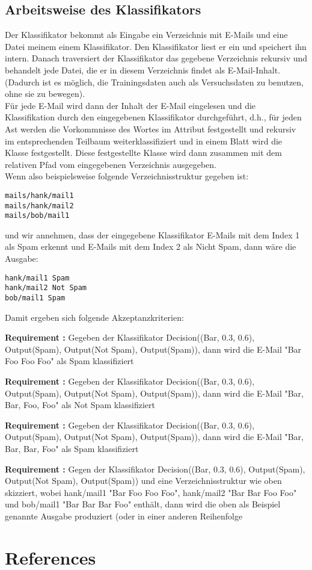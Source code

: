 \documentclass{article}
\newcounter{requirementscount}{}
\newcommand{\requirement}[1] {
        \addtocounter{requirementscount}{1}
        {\bf Requirement \therequirementscount:} #1\\
    }
\begin{document}
\subsection{Arbeitsweise des Klassifikators}
Der Klassifikator bekommt als Eingabe ein Verzeichnis mit E-Mails und eine
Datei meinem einem Klassifikator. Den Klassifikator liest er ein und
speichert ihn intern. Danach traversiert der Klassifikator das gegebene
Verzeichnis rekursiv und behandelt jede Datei, die er in diesem Verzeichnis
findet als E-Mail-Inhalt. (Dadurch ist es m\"oglich, die Trainingsdaten auch
als Versuchsdaten zu benutzen, ohne sie zu bewegen).\\
F\"ur jede E-Mail wird dann der Inhalt der E-Mail eingelesen und die
Klassifikation durch den eingegebenen Klassifikator durchgef\"uhrt, d.h., 
f\"ur jeden Ast werden die Vorkommnisse des Wortes im Attribut
festgestellt und rekursiv im entsprechenden Teilbaum weiterklassifiziert
und in einem Blatt wird die Klasse festgestellt. Diese festgestellte Klasse
wird dann zusammen mit dem relativen Pfad vom eingegebenen Verzeichnis
ausgegeben.\\
Wenn also beispielsweise folgende Verzeichnisstruktur gegeben ist:
\begin{verbatim}
mails/hank/mail1
mails/hank/mail2
mails/bob/mail1
\end{verbatim}
und wir annehmen, dass der eingegebene Klassifikator E-Mails mit dem Index
1 als Spam erkennt und E-Mails mit dem Index 2 als Nicht Spam, dann
w\"are die Ausgabe:
\begin{verbatim}
hank/mail1 Spam
hank/mail2 Not Spam
bob/mail1 Spam
\end{verbatim}
Damit ergeben sich folgende Akzeptanzkriterien:\\
\requirement{Gegeben der Klassifikator Decision((Bar, 0.3, 0.6), Output(Spam),
Output(Not Spam), Output(Spam)), dann wird die E-Mail "Bar Foo Foo Foo" als
Spam klassifiziert}
\requirement{Gegeben der Klassifikator Decision((Bar, 0.3, 0.6), Output(Spam),
Output(Not Spam), Output(Spam)), dann wird die E-Mail "Bar, Bar, Foo, Foo" als
Not Spam klassifiziert}
\requirement{Gegeben der Klassifikator Decision((Bar, 0.3, 0.6), Output(Spam),
Output(Not Spam), Output(Spam)), dann wird die E-Mail "Bar, Bar, Bar, Foo" als
Spam klassifiziert}
\requirement{Gegen der Klassifikator Decision((Bar, 0.3, 0.6), Output(Spam),
Output(Not Spam), Output(Spam)) und eine Verzeichnisstruktur wie oben
skizziert, wobei hank/mail1 "Bar Foo Foo Foo", hank/mail2 "Bar Bar Foo Foo"
und bob/mail1 "Bar Bar Bar Foo" enth\"alt, dann wird die oben als Beispiel
genannte Ausgabe produziert (oder in einer anderen Reihenfolge}

\section{References}
{}

\end{document}
